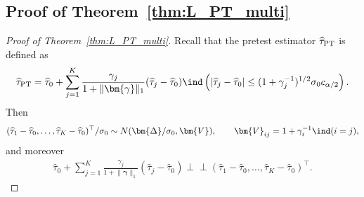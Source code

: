 \documentclass[11pt]{article}
\newcommand{\indep}{\perp \!\!\!\perp}
\newcommand{\htau}{\widehat\tau}
\numberwithin{equation}{section}
\theoremstyle{definition}
\begin{document}
\subsection{Proof of Theorem~\ref{thm:L_PT_multi}}

\begin{proof}[Proof of Theorem~\ref{thm:L_PT_multi}]
Recall that the pretest estimator $\htau_{\rm PT}$ is defined as
\begin{align*}
  \htau_{\rm PT} = \htau_0 + \sum_{j=1}^K \frac{\gamma_j}{1+\lVert \bm{\gamma} \rVert_1} (\htau_j - \htau_0) \ind\left(\lvert \htau_j - \htau_0 \rvert \le (1+\gamma_j^{-1})^{1/2}\sigma_0 c_{\alpha/2}\right).
\end{align*}
Then
\begin{align*}
  (\htau_1 - \htau_0, \ldots, \htau_K - \htau_0)^\top/\sigma_0 \sim N(\bm{\Delta}/\sigma_0, \bm{V}), \qquad \bm{V}_{ij}=1+\gamma_i^{-1}\ind(i=j),
\end{align*}
and moreover
\begin{align*}
  \htau_0 + \sum_{j=1}^K \frac{\gamma_j}{1+\lVert \bm{\gamma} \rVert_1} (\htau_j - \htau_0) \indep  (\htau_1 - \htau_0, \ldots, \htau_K - \htau_0)^\top.
\end{align*}


\end{proof}
\end{document}
